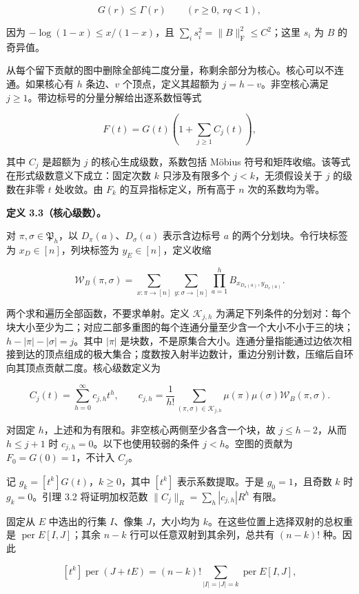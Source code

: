 \documentclass[11pt,a4paper]{article}
\begin{document}
\[G(r)\le\Gamma(r)\qquad(r\ge0,\ rq<1),\]

因为 \(-\log(1-x)\le x/(1-x)\)，且 \(\sum_i s_i^2=\|B\|_{\mathrm F}^2\le C^2\)；这里 \(s_i\) 为 \(B\) 的奇异值。

从每个留下贡献的图中删除全部纯二度分量，称剩余部分为核心。核心可以不连通。如果核心有 \(h\) 条边、\(v\) 个顶点，定义其超额为 \(j=h-v\)。非空核心满足 \(j\ge1\)。带边标号的分量分解给出逐系数恒等式

\[F(t)=G(t)\left(1+\sum_{j\ge1}C_j(t)\right),\]

其中 \(C_j\) 是超额为 \(j\) 的核心生成级数，系数包括 Möbius 符号和矩阵收缩。该等式在形式级数意义下成立：固定次数 \(k\) 只涉及有限多个 \(j<k\)，无须假设关于 \(j\) 的级数在非零 \(t\) 处收敛。由 \(F_k\) 的互异指标定义，所有高于 \(n\) 次的系数均为零。

\textbf{定义 3.3（核心级数）。}

对 \(\pi,\sigma\in\mathfrak P_h\)，以 \(D_\pi(a)\)、\(D_\sigma(a)\) 表示含边标号 \(a\) 的两个分划块。令行块标签为 \(x_D\in[n]\)，列块标签为 \(y_E\in[n]\)，定义收缩

\[\mathcal W_B(\pi,\sigma)
=\sum_{x:\pi\to[n]}\sum_{y:\sigma\to[n]}
\prod_{a=1}^hB_{x_{D_\pi(a)},y_{D_\sigma(a)}}.\]

两个求和遍历全部函数，不要求单射。定义 \(\mathcal K_{j,h}\) 为满足下列条件的分划对：每个块大小至少为二；对应二部多重图的每个连通分量至少含一个大小不小于三的块；\(h-|\pi|-|\sigma|=j\)。其中 \(|\pi|\) 是块数，不是原集合大小。连通分量指能通过边依次相接到达的顶点组成的极大集合；度数按入射半边数计，重边分别计数，压缩后自环向其顶点贡献二度。核心级数定义为

\[C_j(t)=\sum_{h=0}^{\infty}c_{j,h}t^h,\qquad
c_{j,h}=\frac1{h!}\sum_{(\pi,\sigma)\in\mathcal K_{j,h}}
\mu(\pi)\mu(\sigma)\mathcal W_B(\pi,\sigma).\]

对固定 \(h\)，上述和为有限和。非空核心两侧至少各含一个块，故 \(j\le h-2\)，从而 \(h\le j+1\) 时 \(c_{j,h}=0\)。以下也使用较弱的条件 \(j<h\)。空图的贡献为 \(F_0=G(0)=1\)，不计入 \(C_j\)。

记 \(g_k=[t^k]G(t)\)，\(k\ge0\)，其中 \([t^k]\) 表示系数提取。于是 \(g_0=1\)，且奇数 \(k\) 时 \(g_k=0\)。引理 3.2 将证明加权范数 \(\|C_j\|_R=\sum_h|c_{j,h}|R^h\) 有限。

固定从 \(E\) 中选出的行集 \(I\)、像集 \(J\)，大小均为 \(k\)。在这些位置上选择双射的总权重是 \(\operatorname{per}E[I,J]\)；其余 \(n-k\) 行可以任意双射到其余列，总共有 \((n-k)!\) 种。因此

\[[t^k]\operatorname{per}(J+tE)
=(n-k)!\sum_{|I|=|J|=k}\operatorname{per}E[I,J],\]
\end{document}
